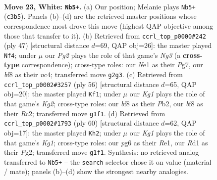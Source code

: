 \documentclass[11pt]{article}
\begin{document}
\clearpage

\begin{figure}[p]\centering
\begin{subfigure}{0.46\textwidth}\centering
\resizebox{\linewidth}{!}{%
\newchessgame
\chessboard[
  setfen={rn2nbr1/1pk4p/4p1p1/p1P3B1/P3P3/2N5/1P3RPP/3RN1K1 w - - 0 23},
  showmover=false,
  pgfstyle=straightmove, color=movearrow, markmove={c3-b5}
]}
\caption{}
\end{subfigure}\hfill
\begin{subfigure}{0.46\textwidth}\centering
\resizebox{\linewidth}{!}{%
\newchessgame
\chessboard[
  setfen={5rk1/p5pp/2r3n1/4pp2/1RNp4/3P3P/P1P2PP1/3R2K1 b - - 0 24},
  showmover=false,
  pgfstyle=straightmove, color=movearrow, markmove={g6-f4}
]}
\caption{}
\end{subfigure}
\\[4pt]
\begin{subfigure}{0.46\textwidth}\centering
\resizebox{\linewidth}{!}{%
\newchessgame
\chessboard[
  setfen={3r2k1/pr2npp1/4p3/2p3p1/P5N1/4PPP1/1PR3KP/2R5 w - - 0 29},
  showmover=false,
  pgfstyle=straightmove, color=movearrow, markmove={g2-f1}
]}
\caption{}
\end{subfigure}\hfill
\begin{subfigure}{0.46\textwidth}\centering
\resizebox{\linewidth}{!}{%
\newchessgame
\chessboard[
  setfen={2r3k1/6pp/1p1p4/rP6/p2P3P/P1n2N2/1R3PP1/4R1K1 w - - 9 31},
  showmover=false,
  pgfstyle=straightmove, color=movearrow, markmove={g1-h2}
]}
\caption{}
\end{subfigure}
\caption{\textbf{Move 23, White: \texttt{Nb5+}.} (a) Our position; Melanie plays \texttt{Nb5+} (\texttt{c3b5}). Panels (b)--(d) are the retrieved master positions whose correspondence most drove this move (highest QAP objective among those that transfer to it). (b) Retrieved from \texttt{ccrl\_top\_p0000\#242} (ply 47) [structural distance $d$=69, QAP obj=26]: the master played \texttt{Nf4}; under $\mu$ our \emph{Pg2} plays the role of that game's \emph{Ng3} (a \textbf{cross-type} correspondence); cross-type roles: our \emph{N}e1 as their \emph{P}g7, our \emph{b}f8 as their \emph{n}c4; transferred move \texttt{g2g3}. (c) Retrieved from \texttt{ccrl\_top\_p0002\#3257} (ply 56) [structural distance $d$=65, QAP obj=20]: the master played \texttt{Kf1}; under $\mu$ our \emph{Kg1} plays the role of that game's \emph{Kg2}; cross-type roles: our \emph{b}f8 as their \emph{P}b2, our \emph{b}f8 as their \emph{R}c2; transferred move \texttt{g1f1}. (d) Retrieved from \texttt{ccrl\_top\_p0002\#1793} (ply 60) [structural distance $d$=62, QAP obj=17]: the master played \texttt{Kh2}; under $\mu$ our \emph{Kg1} plays the role of that game's \emph{Kg1}; cross-type roles: our \emph{p}g6 as their \emph{R}e1, our \emph{R}d1 as their \emph{P}g2; transferred move \texttt{g1f1}. Synthesis: no retrieved analog transferred to \texttt{Nb5+} -- the \texttt{search} selector chose it on value (material / mate); panels (b)--(d) show the strongest nearby analogies.}
\label{fig:thought-m44}
\end{figure}
\end{document}
